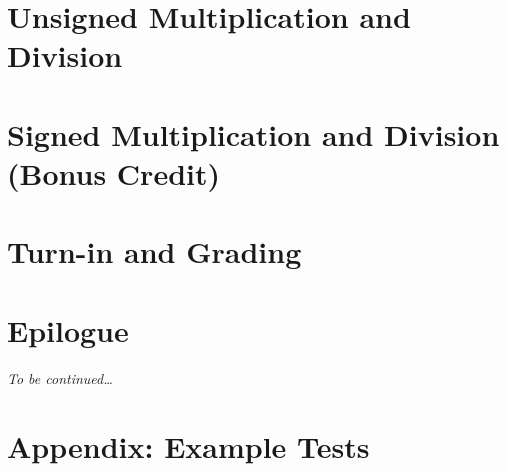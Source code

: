 \documentclass[12pt]{article}
\begin{document}
    \section{Unsigned Multiplication and Division}                                  

    \section{Signed Multiplication and Division (Bonus Credit)}\label{sec:signedMultiplicationDivision}
                                                                                    

    \section{Turn-in and Grading}                                                   

    \section*{Epilogue}                                                             \scenariowrapup

    \textit{To be continued\dots}

    \newpage\appendix

    \section{Appendix: Example Tests}                                               
\end{document}
